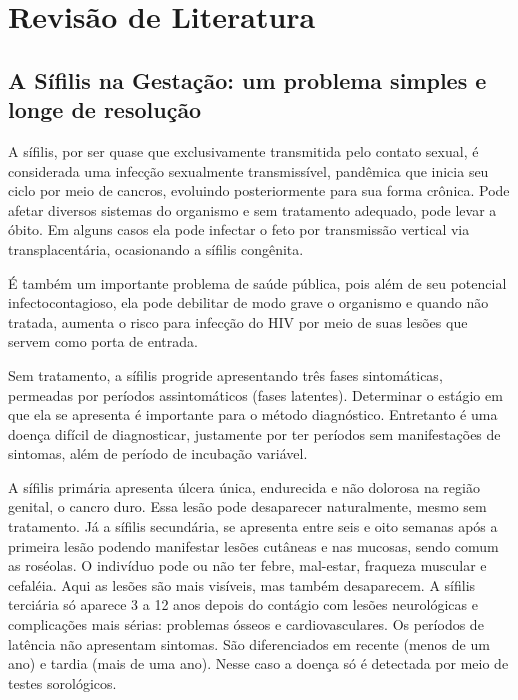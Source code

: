 \section{Revisão de Literatura}
\label{sec:revisao}

\subsection{A Sífilis na Gestação: um problema simples e longe de resolução}
A sífilis, por ser quase que exclusivamente transmitida pelo contato sexual, é considerada uma infecção sexualmente transmissível, pandêmica que inicia seu ciclo por meio de cancros, evoluindo posteriormente para sua forma crônica. Pode afetar diversos sistemas do organismo e sem tratamento adequado, pode levar a óbito. Em alguns casos ela pode infectar o feto por transmissão vertical via transplacentária, ocasionando a sífilis congênita. \cite{silva2015feelings}

É também um importante problema de saúde pública, pois além de seu potencial infectocontagioso, ela pode debilitar de modo grave o organismo e quando não tratada, aumenta o risco para infecção do HIV por meio de suas lesões que servem como porta de entrada. \cite{manual2016sifilis}

Sem tratamento, a sífilis progride apresentando três fases sintomáticas, permeadas por períodos assintomáticos (fases latentes). Determinar o estágio em que ela se apresenta é importante para o método diagnóstico. Entretanto é uma doença difícil de diagnosticar, justamente por ter períodos sem manifestações de sintomas, além de período de incubação variável. \cite{manual2016sifilis}

A sífilis primária apresenta úlcera única, endurecida e não dolorosa  na região genital, o cancro duro. Essa lesão pode desaparecer naturalmente, mesmo sem tratamento. Já a sífilis secundária, se apresenta entre seis e oito semanas após a primeira lesão podendo manifestar lesões cutâneas e nas mucosas, sendo comum as roséolas. O indivíduo pode ou não ter febre, mal-estar, fraqueza muscular e cefaléia. Aqui as lesões são mais visíveis, mas também desaparecem. A sífilis terciária só aparece 3 a 12 anos depois do contágio com lesões neurológicas e complicações mais sérias: problemas ósseos e cardiovasculares. Os períodos de latência não apresentam sintomas. São diferenciados em recente (menos de um ano) e tardia (mais de uma ano). Nesse caso a doença só é detectada por meio de testes sorológicos. \cite{manual2016sifilis}

